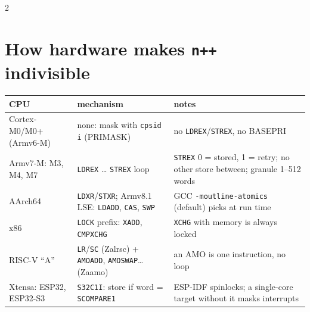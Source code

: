 \documentclass[8pt]{extarticle}
\newcommand\ct[1]{\texttt{#1}}
\begin{document}
\begin{multicols}{2}
\section{How hardware makes \texttt{n++} indivisible}
{\scriptsize\setlength{\tabcolsep}{2pt}
\begin{tabular}{@{}>{\raggedright\arraybackslash}p{17mm}>{\raggedright\arraybackslash}p{26mm}>{\raggedright\arraybackslash}p{34mm}@{}}
\toprule
\textbf{CPU} & \textbf{mechanism} & \textbf{notes}\\
\midrule
Cortex-M0/M0+ (Armv6-M) & none: mask with \ct{cpsid i} (PRIMASK) & no \ct{LDREX}/\ct{STREX}, no BASEPRI\\
Armv7-M: M3, M4, M7 & \ct{LDREX} … \ct{STREX} loop & \ct{STREX} 0 = stored, 1 = retry; no other store between; granule 1–512 words\\
AArch64 & \ct{LDXR}/\ct{STXR}; Armv8.1 LSE: \ct{LDADD}, \ct{CAS}, \ct{SWP} & GCC \ct{-moutline-atomics} (default) picks at run time\\
x86 & \ct{LOCK} prefix: \ct{XADD}, \ct{CMPXCHG} & \ct{XCHG} with memory is always locked\\
RISC-V ``A'' & \ct{LR}/\ct{SC} (Zalrsc) + \ct{AMOADD}, \ct{AMOSWAP}… (Zaamo) & an AMO is one instruction, no loop\\
Xtensa: ESP32, ESP32-S3 & \ct{S32C1I}: store if word = \ct{SCOMPARE1} & ESP-IDF spinlocks; a single-core target without it masks interrupts\\
\bottomrule
\end{tabular}}


\end{multicols}
\end{document}
